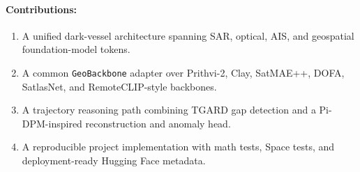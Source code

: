 \documentclass{article}
\begin{document}
\paragraph{Contributions:}
\begin{enumerate}
  \item A unified dark-vessel architecture spanning SAR, optical, AIS, and geospatial foundation-model tokens.
  \item A common \texttt{GeoBackbone} adapter over Prithvi-2, Clay, SatMAE++, DOFA, SatlasNet, and RemoteCLIP-style backbones.
  \item A trajectory reasoning path combining TGARD gap detection and a Pi-DPM-inspired reconstruction and anomaly head.
  \item A reproducible project implementation with math tests, Space tests, and deployment-ready Hugging Face metadata.
\end{enumerate}
\end{document}
